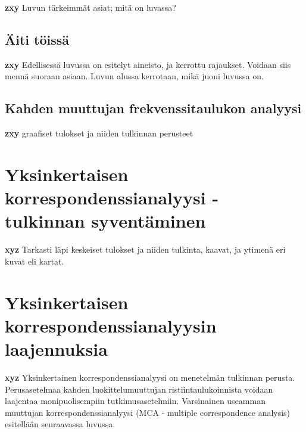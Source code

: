 \documentclass[finnish,]{book}
\theoremstyle{definition}
\theoremstyle{definition}
\theoremstyle{definition}
\theoremstyle{remark}
\begin{document}
\textbf{zxy} Luvun tärkeimmät asiat; mitä on luvassa?

\hypertarget{aiti-toissa}{%
\section{Äiti töissä}\label{aiti-toissa}}

\textbf{zxy} Edellisessä luvussa on esitelyt aineisto, ja kerrottu
rajaukset. Voidaan siis mennä suoraan asiaan. Luvun alussa kerrotaan,
mikä juoni luvussa on.

\hypertarget{kahden-muuttujan-frekvenssitaulukon-analyysi}{%
\section{Kahden muuttujan frekvenssitaulukon
analyysi}\label{kahden-muuttujan-frekvenssitaulukon-analyysi}}

\textbf{zxy} graafiset tulokset ja niiden tulkinnan perusteet

\hypertarget{yksinkertaisen-korrespondenssianalyysi---tulkinnan-syventaminen}{%
\chapter{Yksinkertaisen korrespondenssianalyysi - tulkinnan
syventäminen}\label{yksinkertaisen-korrespondenssianalyysi---tulkinnan-syventaminen}}

\textbf{xyz} Tarkasti läpi keskeiset tulokset ja niiden tulkinta,
kaavat, ja ytimenä eri kuvat eli kartat.

\hypertarget{yksinkertaisen-korrespondenssianalyysin-laajennuksia}{%
\chapter{Yksinkertaisen korrespondenssianalyysin
laajennuksia}\label{yksinkertaisen-korrespondenssianalyysin-laajennuksia}}

\textbf{xyz} Yksinkertainen korrespondenssianalyysi on menetelmän
tulkinnan perusta. Perusasetelmaa kahden luokittelumuuttujan
ristiintaulukoinnista voidaan laajentaa monipuolisempiin
tutkimusasetelmiin. Varsinainen useamman muuttujan
korrespondenssianalyysi (MCA - multiple correspondence analysis)
esitellään seuraavassa luvussa.


\end{document}
